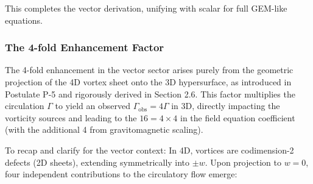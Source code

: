 \documentclass{article}
\begin{document}
This completes the vector derivation, unifying with scalar for full GEM-like equations.

\medskip
\noindent
{}
\medskip

\subsubsection{The 4-fold Enhancement Factor}

The 4-fold enhancement in the vector sector arises purely from the geometric projection of the 4D vortex sheet onto the 3D hypersurface, as introduced in Postulate P-5 and rigorously derived in Section 2.6. This factor multiplies the circulation $\Gamma$ to yield an observed $\Gamma_{\text{obs}} = 4\Gamma$ in 3D, directly impacting the vorticity sources and leading to the $16 = 4 \times 4$ in the field equation coefficient (with the additional 4 from gravitomagnetic scaling).

To recap and clarify for the vector context: In 4D, vortices are codimension-2 defects (2D sheets), extending symmetrically into $\pm w$. Upon projection to $w=0$, four independent contributions to the circulatory flow emerge:
\end{document}
